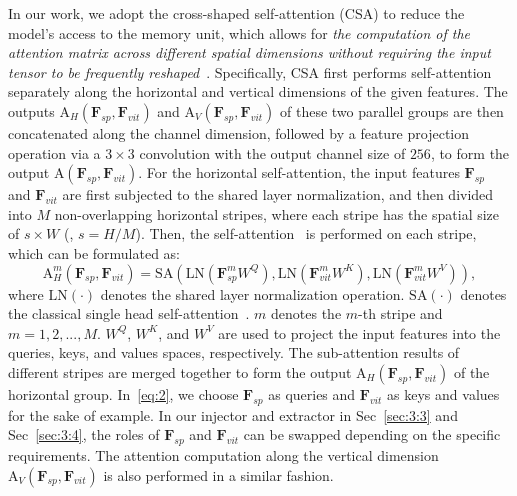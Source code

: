 \myparagraph{\textcolor{red}{Attn Branch.}} In our work, we adopt the cross-shaped self-attention (CSA) to reduce the model's access to the memory unit, which allows for \emph{the computation of the attention matrix across different spatial dimensions without requiring the input tensor to be frequently reshaped}~\citep{dong2022cswin,tu2022maxvit}. 
%
Specifically, CSA first performs self-attention separately along the horizontal and vertical dimensions of the given features. The outputs $\textrm{A}_H(\textbf{F}_{sp},\textbf{F}_{vit})$ and $\textrm{A}_V(\textbf{F}_{sp},\textbf{F}_{vit})$ of these two parallel groups are then concatenated along the channel dimension, followed by a feature projection operation via a $3 \times 3$ convolution with the output channel size of $256$, to form the output $\textrm{A}(\textbf{F}_{sp},\textbf{F}_{vit})$. 
%
For the horizontal self-attention, the input features $\textbf{F}_{sp}$ and $\textbf{F}_{vit}$ are first subjected to the shared layer normalization, and then divided into $M$ non-overlapping horizontal stripes, where each stripe has the spatial size of $s \times W$ (\ie, $s = H/M$). Then, the self-attention~\citep{vaswani2017attention} is performed on each stripe, which can be formulated as:
\begin{equation}
\textrm{A}^{m}_H(\textbf{F}_{sp},\textbf{F}_{vit}) = \textrm{SA}(\textrm{LN}(\textbf{F}^{m}_{sp}W^Q),\textrm{LN}(\textbf{F}^{m}_{vit}W^K),\textrm{LN}(\textbf{F}^{m}_{vit}W^V)),
\label{eq:2}
\end{equation}
where $\textrm{LN}(\cdot)$ denotes the shared layer normalization operation. $\textrm{SA}(\cdot)$ denotes the classical single head self-attention~\citep{vaswani2017attention}. $m$ denotes the $m$-th stripe and $m = 1,2,...,M$. $W^Q$, $W^K$, and $W^V$ are used to project the input features into the queries, keys, and values spaces, respectively. The sub-attention results of different stripes are merged together to form the output $\textrm{A}_H(\textbf{F}_{sp},\textbf{F}_{vit})$ of the horizontal group. In~\eqref{eq:2}, we choose $\textbf{F}_{sp}$ as queries and $\textbf{F}_{vit}$ as keys and values for the sake of example. In our injector and extractor in Sec~\ref{sec:3:3} and Sec~\ref{sec:3:4}, the roles of $\textbf{F}_{sp}$ and $\textbf{F}_{vit}$ can be swapped depending on the specific requirements. The attention computation along the vertical dimension $\textrm{A}_V(\textbf{F}_{sp},\textbf{F}_{vit})$ is also performed in a similar fashion.

